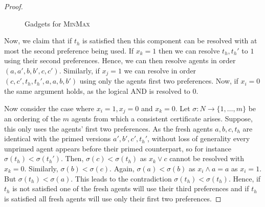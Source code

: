 \documentclass[11pt,a4paper, titlepage]{article}
\theoremstyle{definition}
\begin{document}
\begin{proof}
\begin{figure}
{{
    }
    \label{fig:MinMax:2nots}
    }
    \caption{Gadgets for \textsc{MinMax}}
    \end{figure}

    Now, we claim that if $t_h$ is satisfied then this component can be resolved with at most the second preference being used. 
    If $x_k = 1$ then we can resolve $t_h, t_h'$ to $1$ using their second preferences. 
    Hence, we can then resolve agents in order $(a, a', b, b', c, c')$. 
    Similarly, if $x_j = 1$ we can resolve in order $(c, c', t_h, t_h', a, a, b, b')$ using only the agents first two preferences. 
    Now, if $x_i = 0$ the same argument holds, as the logical AND is resolved to 0. 

    Now consider the case where $x_i = 1, x_j = 0$ and $x_k = 0$. Let $\sigma \colon N \longrightarrow \{1, \ldots, m\}$ be an ordering of the $m$ agents from which a consistent certificate arises. Suppose, this only uses the agents' first two preferences.
    As the fresh agents $a, b, c, t_h$ are identical with the primed versions $a', b', c', t_h'$, without loss of generality every unprimed agent appears before their primed counterpart, so for instance $\sigma(t_h) < \sigma(t_h')$. 
    Then, $\sigma(c) < \sigma(t_h)$ as $x_k \lor c$ cannot be resolved with $x_k = 0$. 
    Similarly, $\sigma(b) < \sigma(c)$. Again, $ \sigma(a) < \sigma(b)$ as $x_i \land a = a$ as $x_i = 1$. But $\sigma(t_h) < \sigma(a)$. This leads to the contradiction $\sigma(t_h) < \sigma(t_h)$. 
    Hence, if $t_h$ is not satisfied one of the fresh agents will use their third preferences and if $t_h$ is satisfied all fresh agents will use only their first two preferences.


\end{proof}
\end{document}

